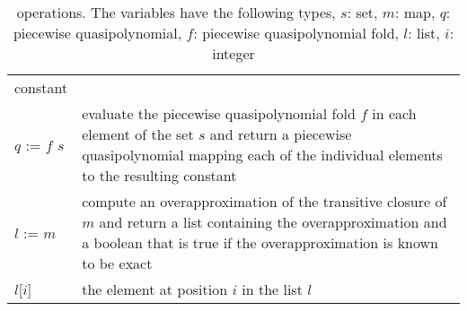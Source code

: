\begin{table}
\begin{tabular}{lp{}}
constant
\\
$q$ := $f$ \ai{@} $s$ &
evaluate the piecewise quasipolynomial fold $f$ in each element
of the set $s$ and return a piecewise quasipolynomial
mapping each of the individual elements to the resulting
constant
\\
$l$ := $m$\ai[\tt]{\^{}+} &
compute an overapproximation of the transitive closure
of $m$ and return a list containing the overapproximation
and a boolean that is true if the overapproximation
is known to be exact
\\
$l$[$i$] &
the element at position $i$ in the list $l$
\\
\end{tabular}
\caption{\protect{} operations.  The variables
have the following types,
$s$: set,
$m$: map,
$q$: piecewise quasipolynomial,
$f$: piecewise quasipolynomial fold,
$l$: list,
$i$: integer
}
\label{t:iscc}
\end{table}
